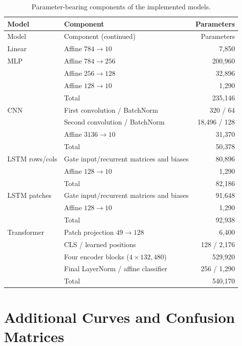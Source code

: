\begin{longtable}{@{}p{}p{}r@{}}
    \caption{Parameter-bearing components of the implemented models.}\label{tab:a1-component-parameters}\\
    \toprule
    Model & Component & Parameters \\
    \midrule
    \endfirsthead
    \toprule
    Model & Component (continued) & Parameters \\
    \midrule
    \endhead
    Linear & Affine $784\to10$ & 7,850 \\
    \midrule
    MLP & Affine $784\to256$ & 200,960 \\
     & Affine $256\to128$ & 32,896 \\
     & Affine $128\to10$ & 1,290 \\
     & Total & 235,146 \\
    \midrule
    CNN & First convolution / BatchNorm & 320 / 64 \\
     & Second convolution / BatchNorm & 18,496 / 128 \\
     & Affine $3136\to10$ & 31,370 \\
     & Total & 50,378 \\
    \midrule
    LSTM rows/cols & Gate input/recurrent matrices and biases & 80,896 \\
     & Affine $128\to10$ & 1,290 \\
     & Total & 82,186 \\
    LSTM patches & Gate input/recurrent matrices and biases & 91,648 \\
     & Affine $128\to10$ & 1,290 \\
     & Total & 92,938 \\
    \midrule
    Transformer & Patch projection $49\to128$ & 6,400 \\
     & CLS / learned positions & 128 / 2,176 \\
     & Four encoder blocks ($4\times132{,}480$) & 529,920 \\
     & Final LayerNorm / affine classifier & 256 / 1,290 \\
     & Total & 540,170 \\
    \bottomrule
\end{longtable}

\section{Additional Curves and Confusion Matrices}
\label{app:additional-results}

